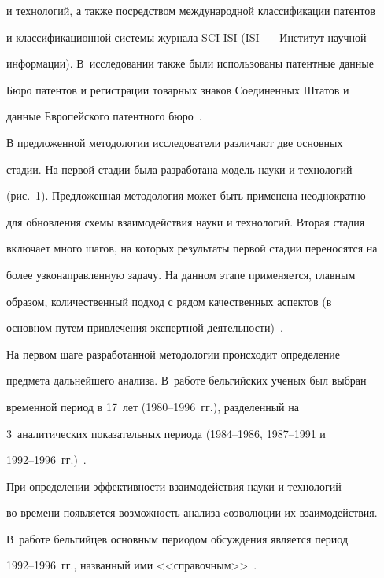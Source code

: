 и технологий, а также посредством международной классификации патентов 


и классификационной системы журнала SCI-ISI (ISI~--- Институт научной 


информации). В~исследовании также были использованы патентные данные 


Бюро патентов и регистрации товарных знаков Соединенных Штатов и 


данные Европейского патентного бюро~\cite{2-koz}. 





     В предложенной методологии исследователи различают две основных 


стадии. На первой стадии была разработана модель науки и технологий 


(рис.~1). Предложенная методология может быть применена неоднократно 


для обновления схемы взаимодействия науки и технологий. Вторая стадия 


включает много шагов, на которых результаты первой стадии переносятся на 


более узконаправленную задачу. На данном этапе применяется, главным 


образом, количественный подход с рядом качественных аспектов (в 


основном путем привлечения экспертной деятельности)~\cite{2-koz}.


     


     На первом шаге разработанной методологии происходит определение 


предмета дальнейшего анализа. В~работе бельгийских ученых был выбран 


временной период в 17~лет (1980--1996~гг.), разделенный на 


3~аналитических показательных периода (1984--1986, 1987--1991 и 


1992--1996~гг.)~\cite{2-koz}.


     


     При определении эффективности взаимодействия науки и технологий 


во времени появляется возможность анализа cоэволюции их взаимодействия. 


В~работе бельгийцев основным периодом обсуждения является период 


     1992--1996~гг., названный ими <<справочным>>~\cite{2-koz}. 


